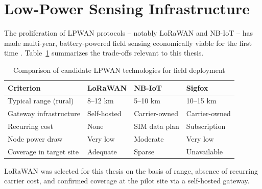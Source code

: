 \section{Low-Power Sensing Infrastructure}
The proliferation of LPWAN protocols -- notably LoRaWAN and NB-IoT -- has made multi-year,
battery-powered field sensing economically viable for the first time \cite{hassanein2021}.
Table~\ref{tab:lpwan-compare} summarizes the trade-offs relevant to this thesis.

\begin{table}[H]
\centering
\caption{Comparison of candidate LPWAN technologies for field deployment}
\label{tab:lpwan-compare}
\begin{tabularx}{\textwidth}{@{}lXXX@{}}
\toprule
\rowcolor{cairoblue!10}
\textbf{Criterion} & \textbf{LoRaWAN} & \textbf{NB-IoT} & \textbf{Sigfox} \\
\midrule
Typical range (rural)      & 8--12 km      & 5--10 km      & 10--15 km \\
Gateway infrastructure     & Self-hosted   & Carrier-owned & Carrier-owned \\
Recurring cost             & None          & SIM data plan & Subscription \\
Node power draw            & Very low      & Moderate      & Very low \\
Coverage in target site    & Adequate      & Sparse        & Unavailable \\
\bottomrule
\end{tabularx}
\end{table}

LoRaWAN was selected for this thesis on the basis of range, absence of recurring
carrier cost, and confirmed coverage at the pilot site via a self-hosted gateway.
